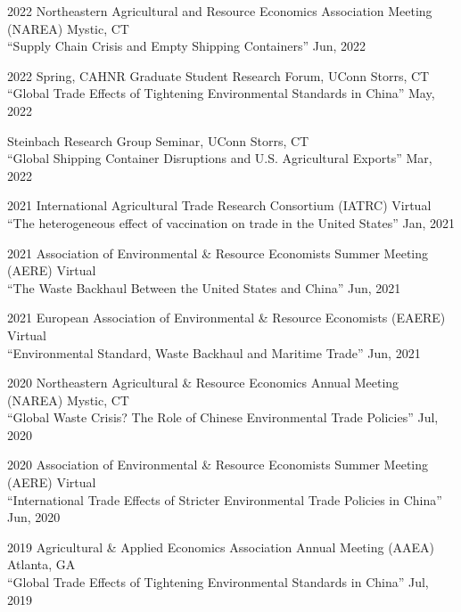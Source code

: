 \documentclass[10.5 pt,letterpaper]{article}
\renewenvironment{itemize}{
	\begin{list}{}{
			\setlength{\leftmargin}{1.5em}
		}
	}{
	\end{list}
}
\begin{document}
\begin{itemize}
		\item[-]  2022 Northeastern Agricultural and Resource Economics Association   Meeting (NAREA)   \hfill   Mystic, CT\vspace{0.15cm} \\
		 	``Supply Chain Crisis and Empty Shipping Containers'' \hfill Jun, 2022  
			
		\item[-] 	2022 Spring, CAHNR Graduate Student Research Forum,  UConn \hfill Storrs, CT\vspace{0.15cm} \\ 
			``Global Trade Effects of Tightening Environmental Standards in China'' \hfill   May, 2022 
			
					\item[-] 	Steinbach Research Group Seminar, UConn \hfill Storrs, CT\vspace{0.15cm} \\
			``Global Shipping Container Disruptions and U.S. Agricultural Exports'' \hfill   Mar, 2022
			
		\item[-]	2021  International Agricultural Trade Research Consortium (IATRC) \hfill  Virtual\vspace{0.15cm}      \\
			``The heterogeneous effect of vaccination on trade in the United States'' \hfill   Jan, 2021 
		
		\item[-]  	2021  Association of Environmental \& Resource Economists Summer Meeting (AERE) \hfill  Virtual\vspace{0.15cm}  \\
		``The Waste Backhaul Between the United States and China'' \hfill   Jun, 2021 
		\item[-]  2021 European Association of Environmental \& Resource Economists (EAERE) \hfill  Virtual\vspace{0.15cm}  \\
		``Environmental Standard, Waste Backhaul and Maritime Trade'' \hfill  Jun, 2021 
		 
		\item[-] 2020  Northeastern Agricultural \& Resource Economics Annual Meeting (NAREA)    \hfill Mystic, CT \vspace{0.15cm} \\
				``Global Waste Crisis? The Role of Chinese Environmental Trade Policies'' \hfill  Jul, 2020 
		\item[-] 2020  Association of Environmental \& Resource Economists  Summer Meeting (AERE)  \hfill  Virtual\vspace{0.15cm} \\
				``International Trade Effects of Stricter Environmental Trade Policies in China'' \hfill   Jun, 2020 
		\item[-] 2019 Agricultural \& Applied Economics Association  Annual Meeting (AAEA) \hfill Atlanta, GA\vspace{0.15cm} \\
				``Global Trade Effects of Tightening Environmental Standards in China''  \hfill Jul, 2019
		

\end{itemize}
\end{document}
